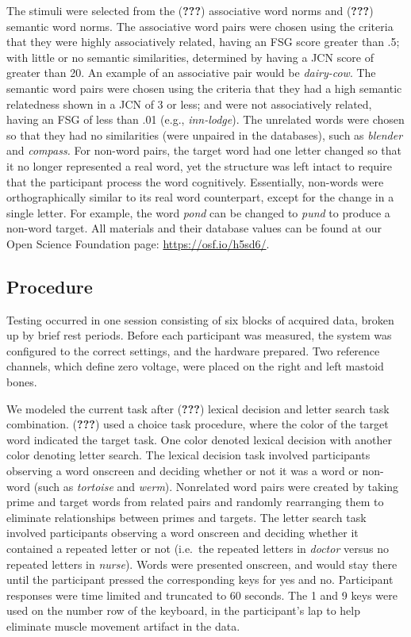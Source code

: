 \documentclass[english,man]{apa6}
\theoremstyle{definition}
\theoremstyle{definition}
\theoremstyle{definition}
\theoremstyle{remark}
\begin{document}
The stimuli were selected from the ({\textbf{???}}) associative word
norms and ({\textbf{???}}) semantic word norms. The associative word
pairs were chosen using the criteria that they were highly associatively
related, having an FSG score greater than .5; with little or no semantic
similarities, determined by having a JCN score of greater than 20. An
example of an associative pair would be \emph{dairy-cow}. The semantic
word pairs were chosen using the criteria that they had a high semantic
relatedness shown in a JCN of 3 or less; and were not associatively
related, having an FSG of less than .01 (e.g., \emph{inn-lodge}). The
unrelated words were chosen so that they had no similarities (were
unpaired in the databases), such as \emph{blender} and \emph{compass.}
For non-word pairs, the target word had one letter changed so that it no
longer represented a real word, yet the structure was left intact to
require that the participant process the word cognitively. Essentially,
non-words were orthographically similar to its real word counterpart,
except for the change in a single letter. For example, the word
\emph{pond} can be changed to \emph{pund} to produce a non-word target.
All materials and their database values can be found at our Open Science
Foundation page: \url{https://osf.io/h5sd6/}.

\subsection{Procedure}\label{procedure}

Testing occurred in one session consisting of six blocks of acquired
data, broken up by brief rest periods. Before each participant was
measured, the system was configured to the correct settings, and the
hardware prepared. Two reference channels, which define zero voltage,
were placed on the right and left mastoid bones.

We modeled the current task after ({\textbf{???}}) lexical decision and
letter search task combination. ({\textbf{???}}) used a choice task
procedure, where the color of the target word indicated the target task.
One color denoted lexical decision with another color denoting letter
search. The lexical decision task involved participants observing a word
onscreen and deciding whether or not it was a word or non-word (such as
\emph{tortoise} and \emph{werm}). Nonrelated word pairs were created by
taking prime and target words from related pairs and randomly
rearranging them to eliminate relationships between primes and targets.
The letter search task involved participants observing a word onscreen
and deciding whether it contained a repeated letter or not (i.e.~the
repeated letters in \emph{doctor} versus no repeated letters in
\emph{nurse}). Words were presented onscreen, and would stay there until
the participant pressed the corresponding keys for yes and no.
Participant responses were time limited and truncated to 60 seconds. The
1 and 9 keys were used on the number row of the keyboard, in the
participant's lap to help eliminate muscle movement artifact in the
data.
\end{document}
